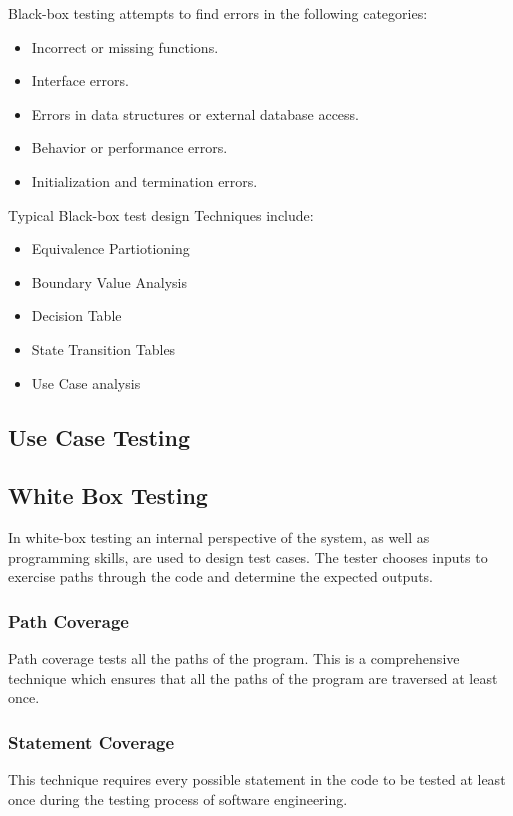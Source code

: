 Black-box testing attempts to find errors in the following categories:
\begin{itemize}
    \item Incorrect or missing functions.
    \item Interface errors.
    \item Errors in data structures or external database access.
    \item Behavior or performance errors.
    \item Initialization and termination errors.
\end{itemize}

Typical Black-box test design Techniques include:
\begin{itemize}
    \item Equivalence Partiotioning
    \item Boundary Value Analysis
    \item Decision Table
    \item State Transition Tables
    \item Use Case analysis
\end{itemize}


\subsection{Use Case Testing}

\subsection{ White Box Testing}
In white-box testing an internal perspective of the system, as well as programming skills, are used to
design test cases. The tester chooses inputs to exercise paths through the code and determine the
expected outputs.



\subsubsection{ Path Coverage}
Path coverage tests all the paths of the program. This is a comprehensive technique which ensures
that all the paths of the program are traversed at least once.
\subsubsection{ Statement Coverage}
This technique requires every possible statement in the code to be tested at least once during the
testing process of software engineering.

